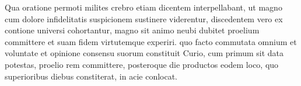 Qua oratione permoti milites crebro etiam dicentem interpellabant, ut magno cum dolore infidelitatis suspicionem sustinere viderentur, discedentem vero ex contione universi cohortantur, magno sit animo neubi dubitet proelium committere et suam fidem virtutemque experiri. quo facto commutata omnium et voluntate et opinione consensu suorum constituit Curio, cum primum sit data potestas, proelio rem committere, posteroque die productos eodem loco, quo superioribus diebus constiterat, in acie conlocat.
